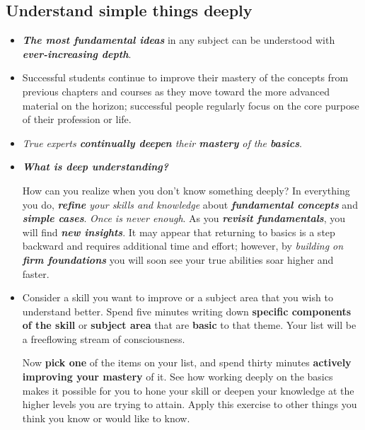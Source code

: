 \documentclass[11pt]{article}
\begin{document}
\subsection{Understand simple things deeply}
\begin{itemize}
\item \emph{\textbf{The most fundamental ideas}} in any subject can be understood with \emph{\textbf{ever-increasing depth}}. 

\item Successful students continue to improve their mastery of the concepts from previous chapters and courses as they move toward the more advanced material on the horizon; successful people regularly focus on the core purpose of their profession or life. 

\item \emph{True experts \textbf{continually deepen} their \textbf{mastery} of the \textbf{basics}}.

\item \emph{\textbf{What is deep understanding?}} 

How can you realize when you don’t know something deeply? In everything you do, \emph{\textbf{refine} your skills and knowledge} about \emph{\textbf{fundamental concepts}} and \emph{\textbf{simple cases}}. \emph{Once is never enough}. As you \emph{\textbf{revisit fundamentals}}, you will find \emph{\textbf{new insights}}. It may appear that returning to basics is a step backward and requires additional time and effort; however, by \emph{building on \textbf{firm foundations}} you will soon see your true abilities soar higher and faster.

\item 
\begin{exercise} 
Consider a skill you want to improve or a subject area that you wish to understand better.  Spend five minutes writing down \textbf{specific components of the skill} or \textbf{subject area} that are \textbf{basic} to that theme. Your list will be a freeflowing stream of consciousness. 

Now \textbf{pick one} of the items on your list, and spend thirty minutes \textbf{actively improving your mastery} of it.  See how working deeply on the basics makes it possible for you to hone your skill or deepen your knowledge at the higher levels you are trying to attain. Apply this exercise to other things you think you know or would like to know.
\end{exercise}


\end{itemize}
\end{document}

